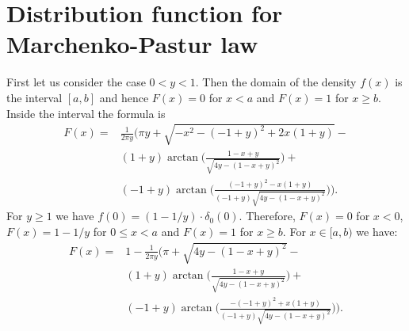 \documentclass[a4paper,11pt]{book}
\theoremstyle{plain}
\theoremstyle{definition}
\begin{document}
    \appendix
    \chapter{Distribution function for Marchenko-Pastur law}
    	First let us consider the case $0 < y < 1$. Then the domain of the density $f(x)$ is the interval $[a, b]$ and hence $F(x) = 0$ for $ x < a$ and $F(x) = 1$ for $x \geq b$. Inside the interval the formula is
    	\[ 
    	\begin{aligned}
    	F(x) = & \frac{1}{2 \pi y} \Bigg( \pi y +\sqrt{ -x^2-(-1+y)^2 + 2x(1+y)} -\\
    	& (1+y) \arctan\bigg( \frac{1-x+y}{\sqrt{4y - (1-x+y)^2 }} \bigg) + \\
    	& (-1+y) \arctan\bigg( \frac{(-1+y)^2-x(1+y)}{(-1+y)\sqrt{4y - (1-x+y)^2 }} \bigg)  \Bigg).
    	\end{aligned}  \]
    	For $y \geq 1$ we have $f(0) = (1-1/y) \cdot \delta_0(0) $. Therefore, $F(x) = 0$ for $x < 0$, $F(x) = 1 - 1/y$ for $0 \leq x < a$ and $F(x) = 1$ for $x \geq b$. For $x \in [a, b)$ we have:
    	\[ 
    	\begin{aligned}
    	F(x) = & 1 - \frac{1}{2 \pi y} \Bigg( \pi  +\sqrt{4y - (1-x+y)^2 } -\\
    	& (1+y) \arctan\bigg( \frac{1-x+y}{\sqrt{4y - (1-x+y)^2 }} \bigg) + \\
    	& (-1+y) \arctan\bigg( \frac{-(-1+y)^2+x(1+y)}{(-1+y)\sqrt{4y - (1-x+y)^2 }} \bigg)  \Bigg).
    	\end{aligned}  \]
    	
\end{document}
